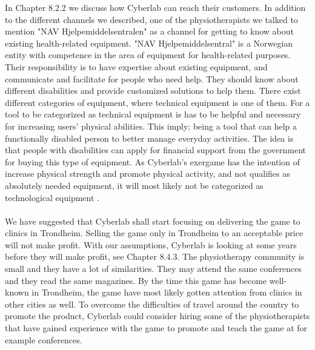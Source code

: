 In Chapter 8.2.2 we discuss how Cyberlab can reach their customers. In addition to the different channels we described, one of the physiotherapists we talked to mention "NAV Hjelpemiddelsentralen" as a channel for getting to know about existing health-related equipment. "NAV Hjelpemiddelsentral" is a Norwegian entity with competence in the area of equipment for health-related purposes. Their responsibility is to have expertise about existing equipment, and communicate and facilitate for people who need help. They should know about different disabilities and provide customized solutions to help them. There exist different categories of equipment, where technical equipment is one of them. For a tool to be categorized as technical equipment is has to be helpful and necessary for increasing users' physical abilities. This imply; being a tool that can help a functionally disabled person to better manage everyday activities. The idea is that people with disabilities can apply for financial support from the government for buying this type of equipment. As Cyberlab’s exergame has the intention of increase physical strength and promote physical activity, and not qualifies as absolutely needed equipment, it will most likely not be categorized as technological equipment \cite{navhjelpemiddel} \cite{navhjelpemiddelsentralen}.  \\ \\
We have suggested that Cyberlab shall start focusing on delivering the game to clinics in Trondheim. Selling the game only in Trondheim to an acceptable price will not make profit. With our assumptions, Cyberlab is looking at some years before they will make profit, see Chapter 8.4.3. The physiotherapy community is small and they have a lot of similarities. They may attend the same conferences and they read the same magazines. By the time this game has become well-known in Trondheim, the game have most likely gotten attention from clinics in other cities as well. To overcome the difficulties of travel around the country to promote the product, Cyberlab could consider hiring some of the physiotherapists that have gained experience with the game to promote and teach the game at for example conferences.\\ \\
